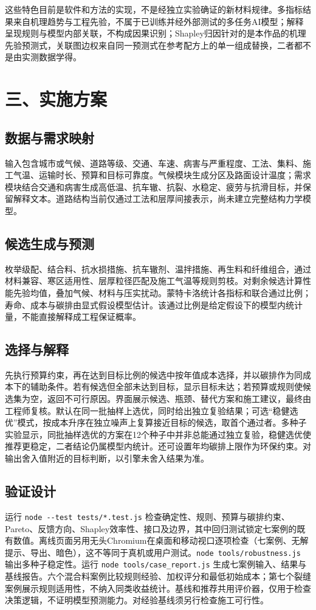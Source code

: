 \documentclass[UTF8,fontset=none,zihao=-4,a4paper]{ctexart}
\begin{document}
这些特色目前是软件和方法的实现，不是经独立实验确证的新材料规律。多指标结果来自机理趋势与工程先验，不属于已训练并经外部测试的多任务AI模型；解释呈现规则与模型内部关联，不构成因果识别；Shapley归因针对的是本作品的机理先验预测式，关联图边权来自同一预测式在参考配方上的单一组成替换，二者都不是由实测数据学得。

\section*{三、实施方案}
\subsection*{数据与需求映射}
输入包含城市或气候、道路等级、交通、车速、病害与严重程度、工法、集料、施工气温、运输时长、预算和目标可靠度。气候模块生成分区及路面设计温度；需求模块结合交通和病害生成高低温、抗车辙、抗裂、水稳定、疲劳与抗滑目标，并保留解释文本。道路结构当前仅通过工法和层厚间接表示，尚未建立完整结构力学模型。

\subsection*{候选生成与预测}
枚举级配、结合料、抗水损措施、抗车辙剂、温拌措施、再生料和纤维组合，通过材料兼容、寒区适用性、层厚粒径匹配及施工气温等规则剪枝。对剩余候选计算性能先验均值，叠加气候、材料与压实扰动。蒙特卡洛统计各指标和联合通过比例；寿命、成本与碳排由显式假设模型估计。该通过比例是给定假设下的模型内统计量，不能直接解释成工程保证概率。

\subsection*{选择与解释}
先执行预算约束，再在达到目标比例的候选中按年值成本选择，并以碳排作为同成本下的辅助条件。若有候选但全部未达到目标，显示目标未达；若预算或规则使候选集为空，返回不可行原因。界面展示候选、瓶颈、替代方案和施工建议，最终由工程师复核。默认在同一批抽样上选优，同时给出独立复验结果；可选“稳健选优”模式，按成本升序在独立噪声上复算接近目标的候选，取首个通过者。多种子实验显示，同批抽样选优的方案在12个种子中并非总能通过独立复验，稳健选优使推荐更稳定，二者结论仍属模型内统计。还可设置年均碳排上限作为环保约束。对输出舍入值附近的目标判断，以引擎未舍入结果为准。

\subsection*{验证设计}
运行 \texttt{node -\allowbreak{}-\allowbreak{}test tests/\allowbreak{}*.\allowbreak{}test.\allowbreak{}js} 检查确定性、规则、预算与碳排约束、Pareto、反馈方向、Shapley效率性、接口及边界，其中回归测试锁定七案例的既有数值。离线页面另用无头Chromium在桌面和移动视口逐项检查（七案例、无解提示、导出、暗色），这不等同于真机或用户测试。\texttt{node tools/\allowbreak{}robustness.\allowbreak{}js} 输出多种子稳定性。运行 \texttt{node tools/\allowbreak{}case\_\allowbreak{}report.\allowbreak{}js} 生成七案例输入、结果与基线报告。六个混合料案例比较规则经验、加权评分和最低初始成本；第七个裂缝案例展示规则适用性，不纳入同类收益统计。基线和推荐共用评价器，仅用于检查决策逻辑，不证明模型预测能力。对经验基线须另行检查施工可行性。
\end{document}
